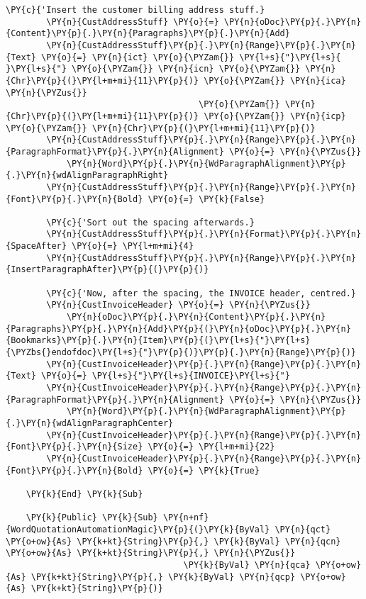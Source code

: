 \begin{Verbatim}[commandchars=\\\{\}]
        \PY{c}{'Insert the customer billing address stuff.}
        \PY{n}{CustAddressStuff} \PY{o}{=} \PY{n}{oDoc}\PY{p}{.}\PY{n}{Content}\PY{p}{.}\PY{n}{Paragraphs}\PY{p}{.}\PY{n}{Add}
        \PY{n}{CustAddressStuff}\PY{p}{.}\PY{n}{Range}\PY{p}{.}\PY{n}{Text} \PY{o}{=} \PY{n}{ict} \PY{o}{\PYZam{}} \PY{l+s}{"}\PY{l+s}{ }\PY{l+s}{"} \PY{o}{\PYZam{}} \PY{n}{icn} \PY{o}{\PYZam{}} \PY{n}{Chr}\PY{p}{(}\PY{l+m+mi}{11}\PY{p}{)} \PY{o}{\PYZam{}} \PY{n}{ica} \PY{n}{\PYZus{}}
                                      \PY{o}{\PYZam{}} \PY{n}{Chr}\PY{p}{(}\PY{l+m+mi}{11}\PY{p}{)} \PY{o}{\PYZam{}} \PY{n}{icp} \PY{o}{\PYZam{}} \PY{n}{Chr}\PY{p}{(}\PY{l+m+mi}{11}\PY{p}{)}
        \PY{n}{CustAddressStuff}\PY{p}{.}\PY{n}{Range}\PY{p}{.}\PY{n}{ParagraphFormat}\PY{p}{.}\PY{n}{Alignment} \PY{o}{=} \PY{n}{\PYZus{}}
            \PY{n}{Word}\PY{p}{.}\PY{n}{WdParagraphAlignment}\PY{p}{.}\PY{n}{wdAlignParagraphRight}
        \PY{n}{CustAddressStuff}\PY{p}{.}\PY{n}{Range}\PY{p}{.}\PY{n}{Font}\PY{p}{.}\PY{n}{Bold} \PY{o}{=} \PY{k}{False}

        \PY{c}{'Sort out the spacing afterwards.}
        \PY{n}{CustAddressStuff}\PY{p}{.}\PY{n}{Format}\PY{p}{.}\PY{n}{SpaceAfter} \PY{o}{=} \PY{l+m+mi}{4}
        \PY{n}{CustAddressStuff}\PY{p}{.}\PY{n}{Range}\PY{p}{.}\PY{n}{InsertParagraphAfter}\PY{p}{(}\PY{p}{)}

        \PY{c}{'Now, after the spacing, the INVOICE header, centred.}
        \PY{n}{CustInvoiceHeader} \PY{o}{=} \PY{n}{\PYZus{}}
            \PY{n}{oDoc}\PY{p}{.}\PY{n}{Content}\PY{p}{.}\PY{n}{Paragraphs}\PY{p}{.}\PY{n}{Add}\PY{p}{(}\PY{n}{oDoc}\PY{p}{.}\PY{n}{Bookmarks}\PY{p}{.}\PY{n}{Item}\PY{p}{(}\PY{l+s}{"}\PY{l+s}{\PYZbs{}endofdoc}\PY{l+s}{"}\PY{p}{)}\PY{p}{.}\PY{n}{Range}\PY{p}{)}
        \PY{n}{CustInvoiceHeader}\PY{p}{.}\PY{n}{Range}\PY{p}{.}\PY{n}{Text} \PY{o}{=} \PY{l+s}{"}\PY{l+s}{INVOICE}\PY{l+s}{"}
        \PY{n}{CustInvoiceHeader}\PY{p}{.}\PY{n}{Range}\PY{p}{.}\PY{n}{ParagraphFormat}\PY{p}{.}\PY{n}{Alignment} \PY{o}{=} \PY{n}{\PYZus{}}
            \PY{n}{Word}\PY{p}{.}\PY{n}{WdParagraphAlignment}\PY{p}{.}\PY{n}{wdAlignParagraphCenter}
        \PY{n}{CustInvoiceHeader}\PY{p}{.}\PY{n}{Range}\PY{p}{.}\PY{n}{Font}\PY{p}{.}\PY{n}{Size} \PY{o}{=} \PY{l+m+mi}{22}
        \PY{n}{CustInvoiceHeader}\PY{p}{.}\PY{n}{Range}\PY{p}{.}\PY{n}{Font}\PY{p}{.}\PY{n}{Bold} \PY{o}{=} \PY{k}{True}

    \PY{k}{End} \PY{k}{Sub}

    \PY{k}{Public} \PY{k}{Sub} \PY{n+nf}{WordQuotationAutomationMagic}\PY{p}{(}\PY{k}{ByVal} \PY{n}{qct} \PY{o+ow}{As} \PY{k+kt}{String}\PY{p}{,} \PY{k}{ByVal} \PY{n}{qcn} \PY{o+ow}{As} \PY{k+kt}{String}\PY{p}{,} \PY{n}{\PYZus{}}
                                   \PY{k}{ByVal} \PY{n}{qca} \PY{o+ow}{As} \PY{k+kt}{String}\PY{p}{,} \PY{k}{ByVal} \PY{n}{qcp} \PY{o+ow}{As} \PY{k+kt}{String}\PY{p}{)}


\end{Verbatim}
